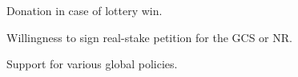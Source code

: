 \begin{figure}[h!]
    \caption{Donation in case of lottery win.}\label{fig:variables_donation}
\end{figure}

\begin{figure}[h!]
    \caption{Willingness to sign real-stake petition for the GCS or NR.}\label{fig:variables_petition}
\end{figure}

\begin{figure}[h!] %
    \caption{Support for various global policies.}\label{fig:support_likert}
\end{figure}


